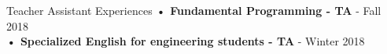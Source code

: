\documentclass{resume} %
\begin{document}
\begin{rSection}{Teacher Assistant Experiences}
\textbf{• Fundamental Programming - TA} - Fall 2018 \\
\textbf{• Specialized English for engineering students - TA} - Winter 2018
\end{rSection}
\end{document}
